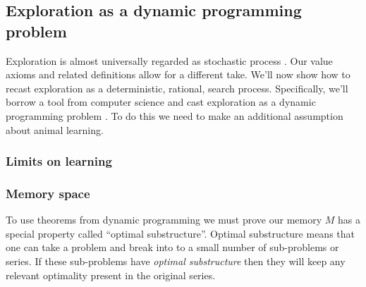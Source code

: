 \documentclass[9pt,twocolumn,twoside]{pnas-new}
\begin{document}


\subsection*{Exploration as a dynamic programming problem}
Exploration is almost universally regarded as stochastic process \cite{Sutton2018,Jaegle}. Our value axioms and related definitions allow for a different take. We'll now show how to recast exploration as a deterministic, rational, search process. Specifically, we'll borrow a tool from computer science and cast exploration as a dynamic programming problem \cite{TODO}. To do this we need to make an additional assumption about animal learning.

\subsubsection*{Limits on learning}



\subsubsection*{Memory space}
To use theorems from dynamic programming we must prove our memory $M$ has a special property called ``optimal substructure''. Optimal substructure means that one can take a problem and break into to a small number of sub-problems or series. If these sub-problems have \textit{optimal substructure} then they will keep any relevant optimality present in the original series. %
\end{document}
